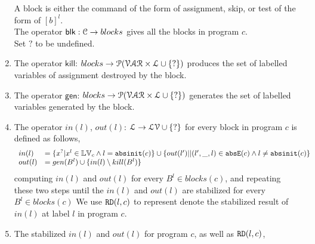 \begin{enumerate}
A block  is either the command of the form of assignment, skip, or test of the form of $[b]^{l}$.\\
The operator $\mathsf{blk} : \mathcal{C} \to blocks$ gives all the blocks in program $c$.
\\
 Set $?$ to be undefined.
\item The operator $\mathsf{kill}$: $blocks \to \mathcal{P}(\mathcal{VAR} \times \mathcal{L} \cup \{?\})$ produces the set of labelled variables of assignment destroyed by the block.
\item  The operator $\mathsf{gen}$: $blocks \to \mathcal{P}(\mathcal{VAR} \times \mathcal{L} \cup \{?\})$ generates the set of labelled variables generated by the block.
\item The operator  $in(l)$, $out(l)$: $ \mathcal{L} \to \mathcal{LV} \cup \{?\}$ for every block in program $c$ is defined as follows,
 \[
 \begin{array}{ll}
    in(l)  & = \{ x^{?} | x^l \in \mathbb{LV}_c \land  l = \mathtt{abs}{\mathtt{init}}(c) \}  
    \cup \{ out(l')|  | (l',\_, l) \in \mathtt{abs}{\mathtt{E}}(c) \land  l \neq \mathtt{abs}{\mathtt{init}}(c)\}  \\
     out(l)  & =  gen(B^{l}) \cup \{ in(l) \setminus kill(B^l)  \}  
 \end{array}
 \]
computing $in(l)$ and $out(l)$ for every $B^l \in blocks(c) $, and repeating these two steps
until the $in(l)$ and $out(l)$ are stabilized for every $B^l \in blocks(c) $
We use $\mathtt{RD}(l,c)$ to represent 
denote the stabilized result of $in(l)$ at label $l$ in program $c$. 
\item The stabilized $in(l)$ and $out(l)$ for program $c$, as well as $\mathtt{RD}(l, c)$,

\end{enumerate}
